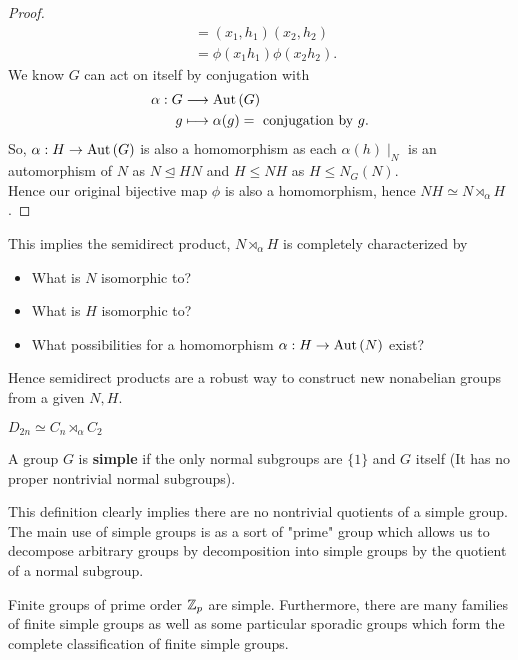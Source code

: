 \begin{proof}
\begin{align*}
										   &=  \left( x_1, h_1 \right) \left( x_2, h_2  \right)\\
										   &= \phi\left( x_1h_1 \right) \phi \left( x_2h_2 \right) .
	\end{align*}
We know \(G\) can act on itself by conjugation with \begin{align*}
	\alpha: G  &\longrightarrow  \operatorname{Aut} \left( G \right) \\
	g &\longmapsto \alpha(g) = \text{ conjugation by \(g\)}
.\end{align*}
So, \(\alpha : H \to \operatorname{Aut} \left( G \right) \) is also a homomorphism as each \(\alpha \left( h \right) \mid_{N}\) is an automorphism of \(N\) as \(N \trianglelefteq HN\) and \(H \le NH\) as \(H \le N_{G}\left( N \right) \).\\
Hence our original bijective map \(\phi\) is also a homomorphism, hence \(NH \simeq N \rtimes_{\alpha} H\).
\end{proof}
This implies the semidirect product, \(N \rtimes_{\alpha} H\) is completely characterized by
\begin{itemize}
	\item What is \(N\) isomorphic to?
		\item What is \(H\) isomorphic to?
		\item What possibilities for a homomorphism \(\alpha : H \to \operatorname{Aut} \left( N \right) \) exist?
\end{itemize}
Hence semidirect products are a robust way to construct new nonabelian groups from a given \(N, H\).
\begin{example}
	\(D_{2n} \simeq C_{n} \rtimes_{\alpha} C_2\)
\end{example}
\begin{definition}
	A group \(G\) is \textbf{simple} if the only normal subgroups are \(\{1\} \) and \(G\) itself (It has no proper nontrivial normal subgroups).
\end{definition}
This definition clearly implies there are no nontrivial quotients of a simple group. The main use of simple groups is as a sort of "prime" group which allows us to decompose arbitrary groups by decomposition into simple groups by the quotient of a normal subgroup.
\begin{example}
	Finite groups of prime order \(\mathbb{Z}_{p}\) are simple. Furthermore, there are many families of finite simple groups as well as some particular sporadic groups which form the complete classification of finite simple groups.
\end{example}

